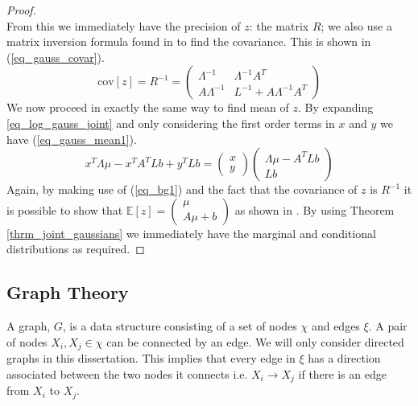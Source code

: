 \documentclass[../masters.tex]{subfiles}
\begin{document}
\begin{proof}
\begin{equation}
\end{equation}
From this we immediately have the precision of $z$: the matrix $R$; we also use a matrix inversion formula found in \cite{bishop} to find the covariance. This is shown in (\ref{eq_gauss_covar}).
\begin{equation}
\text{cov}[z] = R^{-1} = \begin{pmatrix}
\Lambda^{-1} & \Lambda^{-1}A^T \\ A\Lambda^{-1} & L^{-1}+A\Lambda^{-1}A^T
\end{pmatrix}
\label{eq_gauss_covar}
\end{equation}
We now proceed in exactly the same way to find mean of $z$. By expanding \ref{eq_log_gauss_joint} and only considering the first order terms in $x$ and $y$ we have (\ref{eq_gauss_mean1}).
\begin{equation}
x^T\Lambda\mu-x^TA^TLb+y^TLb = \begin{pmatrix}
x \\ y
\end{pmatrix}\begin{pmatrix}
\Lambda\mu - A^TLb \\Lb
\end{pmatrix}
\label{eq_gauss_mean1}
\end{equation}
Again, by making use of (\ref{eq_bg1}) and the fact that the covariance of $z$ is $R^{-1}$ it is possible to show that $\mathbb{E}[z]=\begin{pmatrix}
\mu \\ A\mu +b
\end{pmatrix}$ as shown in \cite{bishop}. By using Theorem \ref{thrm_joint_gaussians} we immediately have the marginal and conditional distributions as required.
\end{proof}

\subsection{Graph Theory}
A graph, $G$, is a data structure consisting of a set of nodes $\chi$ and edges $\xi$. A pair of nodes $X_i, X_j \in \chi$ can be connected by an edge. We will only consider directed graphs in this dissertation. This implies that every edge in $\xi$ has a direction associated between the two nodes it connects i.e. $X_i \rightarrow X_j$ if there is an edge from $X_i$ to $X_j$.
\end{document}
